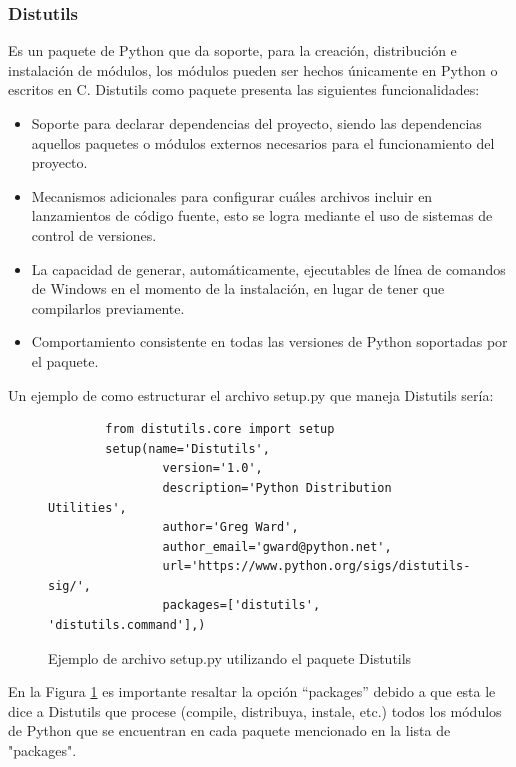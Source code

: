 \subsubsection{Distutils}
Es un paquete de Python que da soporte, para la creación, distribución e instalación de módulos, los módulos pueden ser hechos únicamente en Python o escritos en C. Distutils como paquete presenta las siguientes funcionalidades:
\begin{itemize}
    \item Soporte para declarar dependencias del proyecto, siendo las dependencias aquellos paquetes o módulos externos necesarios para el funcionamiento del proyecto.
    \item Mecanismos adicionales para configurar cuáles archivos incluir en lanzamientos de código fuente, esto se logra mediante el uso de sistemas de control de versiones.
    \item La capacidad de generar, automáticamente, ejecutables de línea de comandos de Windows en el momento de la instalación, en lugar de tener que compilarlos previamente.
    \item Comportamiento consistente en todas las versiones de Python soportadas por el paquete.
\end{itemize}
Un ejemplo de como estructurar el archivo setup.py que maneja Distutils sería:
\begin{figure}[H]
    \centering
    \begin{verbatim}
		from distutils.core import setup
		setup(name='Distutils',
                version='1.0',
                description='Python Distribution Utilities',
                author='Greg Ward',
                author_email='gward@python.net',
                url='https://www.python.org/sigs/distutils-sig/',
                packages=['distutils', 'distutils.command'],)
	\end{verbatim}
    \caption{Ejemplo de archivo setup.py utilizando el paquete Distutils}
    \label{ejDistutils}
\end{figure}
En la Figura \ref{ejDistutils} es importante resaltar la opción ``packages'' debido a que esta le dice a Distutils que procese (compile, distribuya, instale, etc.) todos los módulos de Python que se encuentran en cada paquete mencionado en la lista de "packages".
